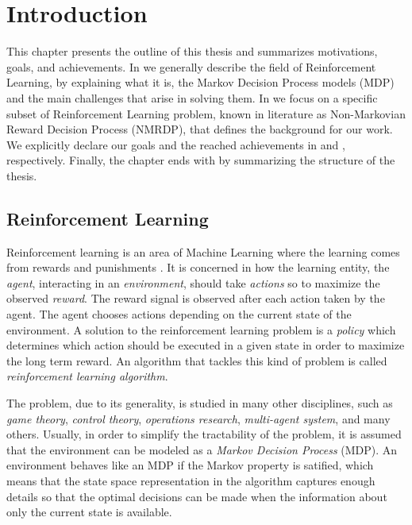 \chapter{Introduction}
This chapter presents the outline of this thesis and summarizes motivations, goals, and achievements. In  we generally describe the field of Reinforcement Learning, by explaining what it is, the Markov Decision Process models (MDP) and the main challenges that arise in solving them. In  we focus on a specific subset of Reinforcement Learning problem, known in literature as Non-Markovian Reward Decision Process (NMRDP), that defines the background for our work. We explicitly declare our goals and the reached achievements in  and , respectively. Finally, the chapter ends with  by summarizing the structure of the thesis.

\section{Reinforcement Learning}\label{sect:intro-rl}
Reinforcement learning is an area of Machine Learning where the learning comes from rewards and punishments \citep{Sutton:1998:IRL:551283}. It is concerned in how the learning entity, the \emph{agent}, interacting in an \emph{environment}, should take \emph{actions} so to maximize the observed \emph{reward}. The reward signal is observed after each action taken by the agent. The agent chooses actions depending on the current state of the environment. A solution to the reinforcement learning problem is a \emph{policy} which determines which action should
be executed in a given state in order to maximize the long term reward. An algorithm that tackles this kind of problem is called \emph{reinforcement learning algorithm}.

\medskip
The problem, due to its generality, is studied in many other disciplines, such as \emph{game theory}, \emph{control theory}, \emph{operations research}, \emph{multi-agent system}, and many others. Usually, in order to simplify the tractability of the problem, it is assumed that the environment can be modeled as a \emph{Markov Decision Process} (MDP). An environment behaves like an MDP if the Markov property is satified, which means that the state space representation in the algorithm captures enough details so that the optimal decisions can be made when the information about only the current state is available. 

